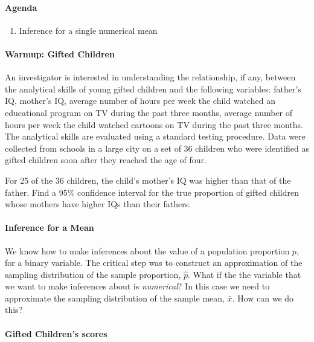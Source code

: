 \documentclass[10pt]{article}\usepackage[]{graphicx}\usepackage[]{color}
\begin{document}
\paragraph{Agenda}
\begin{enumerate}
  \itemsep0em
  \item Inference for a single numerical mean
\end{enumerate}

\paragraph{Warmup: Gifted Children}

An investigator is interested in understanding the relationship, if any, between the analytical skills of young gifted children and the following variables: father's IQ, mother's IQ, average number of hours per week the child watched an educational program on TV during the past three months, average number of hours per week the child watched cartoons on TV during the past three months. The analytical skills are evaluated using a standard testing procedure. Data were collected from schools in a large city on a set of 36 children who were identified as gifted children soon after they reached the age of four.

For 25 of the 36 children, the child's mother's IQ was higher than that of the father. Find a 95\% confidence interval for the true proportion of gifted children whose mothers have higher IQs than their fathers. 


\vspace{2in}

\paragraph{Inference for a Mean}

We know how to make inferences about the value of a population proportion $p$, for a binary variable. The critical step was to construct an approximation of the sampling distribution of the sample proportion, $\hat{p}$. What if the the variable that we want to make inferences about is \emph{numerical}? In this case we need to approximate the sampling distribution of the sample mean, $\bar{x}$. How can we do this?

\paragraph{Gifted Children's scores}
\end{document}
